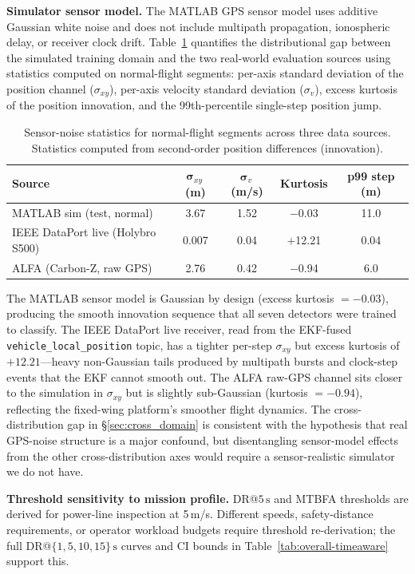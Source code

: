 \documentclass{ieeeaccess}
\begin{document}
\textbf{Simulator sensor model.}
The MATLAB GPS sensor model uses additive Gaussian white noise and does
not include multipath propagation, ionospheric delay, or receiver clock
drift.
Table~\ref{tab:noise_stats} quantifies the distributional gap between the
simulated training domain and the two real-world evaluation sources using
statistics computed on normal-flight segments: per-axis standard deviation
of the position channel ($\sigma_{xy}$), per-axis velocity standard deviation
($\sigma_v$), excess kurtosis of the position innovation, and the
99th-percentile single-step position jump.

\begin{table}[!t]
\caption{Sensor-noise statistics for normal-flight segments across three
data sources. Statistics computed from second-order position differences
(innovation).}
\label{tab:noise_stats}
\centering
\small
\begin{tabular}{lcccc}
\toprule
\textbf{Source} & $\boldsymbol{\sigma}_{xy}$\,\textbf{(m)} &
$\boldsymbol{\sigma}_v$\,\textbf{(m/s)} &
\textbf{Kurtosis} & \textbf{p99 step (m)} \\
\midrule
MATLAB sim (test, normal) & 3.67 & 1.52 & $-$0.03 & 11.0 \\
IEEE DataPort live (Holybro S500) & 0.007 & 0.04 & $+$12.21 & 0.04 \\
ALFA (Carbon-Z, raw GPS) & 2.76 & 0.42 & $-$0.94 & 6.0 \\
\bottomrule
\end{tabular}
\end{table}

The MATLAB sensor model is Gaussian by design (excess kurtosis $= -0.03$),
producing the smooth innovation sequence that all seven detectors were
trained to classify. The IEEE DataPort live receiver, read from the
EKF-fused \texttt{vehicle\_local\_position} topic, has a tighter per-step
$\sigma_{xy}$ but excess kurtosis of $+12.21$---heavy non-Gaussian tails
produced by multipath bursts and clock-step events that the EKF cannot
smooth out. The ALFA raw-GPS channel sits closer to the simulation in
$\sigma_{xy}$ but is slightly sub-Gaussian (kurtosis $= -0.94$), reflecting
the fixed-wing platform's smoother flight dynamics.
The cross-distribution gap in \S\ref{sec:cross_domain} is consistent
with the hypothesis that real GPS-noise structure is a major confound,
but disentangling sensor-model effects from the other cross-distribution
axes would require a sensor-realistic simulator we do not have.

\textbf{Threshold sensitivity to mission profile.}
DR@$5\,\text{s}$ and MTBFA thresholds are derived for power-line
inspection at 5\,m/s. Different speeds, safety-distance requirements,
or operator workload budgets require threshold re-derivation; the
full DR@$\{1,5,10,15\}\,\text{s}$ curves and CI bounds in
Table~\ref{tab:overall-timeaware} support this.
\end{document}
